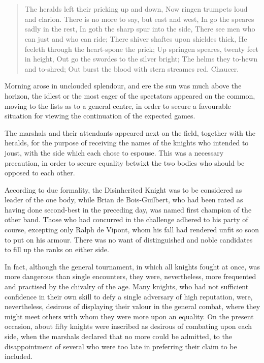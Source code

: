 \chapter{}

\begin{quote}
The heralds left their pricking up and down,
Now ringen trumpets loud and clarion.
There is no more to say, but east and west,
In go the speares sadly in the rest,
In goth the sharp spur into the side,
There see men who can just and who can ride;
There shiver shaftes upon shieldes thick,
He feeleth through the heart-spone the prick;
Up springen speares, twenty feet in height,
Out go the swordes to the silver bright;
The helms they to-hewn and to-shred;
Out burst the blood with stern streames red.
Chaucer.
\end{quote}

Morning arose in unclouded splendour, and ere the sun was much above the
horizon, the idlest or the most eager of the spectators appeared on the
common, moving to the lists as to a general centre, in order to secure a
favourable situation for viewing the continuation of the expected games.

The marshals and their attendants appeared next on the field, together
with the heralds, for the purpose of receiving the names of the knights
who intended to joust, with the side which each chose to espouse. This
was a necessary precaution, in order to secure equality betwixt the two
bodies who should be opposed to each other.

According to due formality, the Disinherited Knight was to be considered
as leader of the one body, while Brian de Bois-Guilbert, who had been
rated as having done second-best in the preceding day, was named first
champion of the other band. Those who had concurred in the challenge
adhered to his party of course, excepting only Ralph de Vipont, whom his
fall had rendered unfit so soon to put on his armour. There was no want
of distinguished and noble candidates to fill up the ranks on either
side.

In fact, although the general tournament, in which all knights fought at
once, was more dangerous than single encounters, they were,
nevertheless, more frequented and practised by the chivalry of the age.
Many knights, who had not sufficient confidence in their own skill to
defy a single adversary of high reputation, were, nevertheless, desirous
of displaying their valour in the general combat, where they might meet
others with whom they were more upon an equality. On the present
occasion, about fifty knights were inscribed as desirous of combating
upon each side, when the marshals declared that no more could be
admitted, to the disappointment of several who were too late in
preferring their claim to be included.

